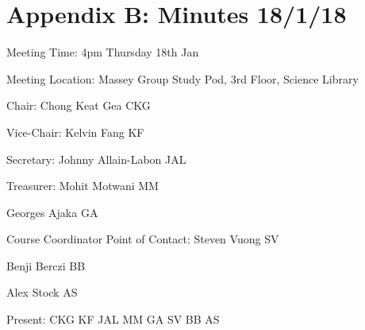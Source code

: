 
\noindent 
\section{Appendix B: Minutes 18/1/18}

\noindent Meeting Time: 4pm Thursday 18th Jan

\noindent Meeting Location: Massey Group Study Pod, 3rd Floor, Science Library\textbf{}\\

\noindent 

\noindent \textbf{}

\noindent Chair: Chong Keat Gea CKG

\noindent Vice-Chair: Kelvin Fang KF

\noindent Secretary: Johnny Allain-Labon JAL

\noindent Treasurer: Mohit Motwani MM

\noindent Georges Ajaka GA

\noindent Course Coordinator Point of Contact: Steven Vuong SV

\noindent Benji Berczi BB

\noindent Alex Stock AS

\noindent 

\noindent Present: CKG KF JAL MM GA SV BB AS\\

\noindent 


